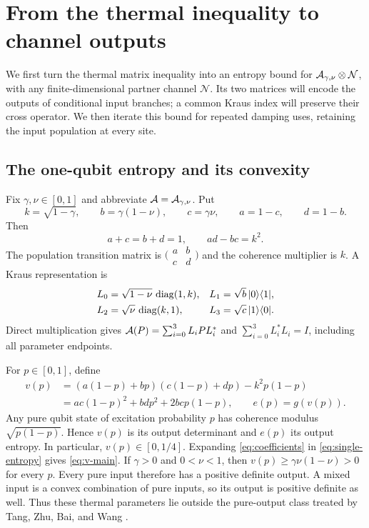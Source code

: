 \section{From the thermal inequality to channel outputs}\label{sec:output}

We first turn the thermal matrix inequality into an entropy bound for
$\mathcal A_{\gamma,\nu}\otimes\mathcal N$, with any finite-dimensional
partner channel $\mathcal N$. Its two matrices will encode the outputs
of conditional input branches; a common Kraus index will preserve their
cross operator. We then iterate this bound for repeated damping uses,
retaining the input population at every site.

\subsection{The one-qubit entropy and its convexity}

Fix $\gamma,\nu\in[0,1]$ and abbreviate
$\mathcal A=\mathcal A_{\gamma,\nu}$. Put
\begin{equation}\label{eq:coefficients}
 k=\sqrt{1-\gamma},\qquad b=\gamma(1-\nu),\qquad
 c=\gamma\nu,\qquad a=1-c,\qquad d=1-b.
\end{equation}
Then
\begin{equation}\label{eq:coefficient-identities}
 a+c=b+d=1,\qquad ad-bc=k^2.
\end{equation}
The population transition matrix is
$\bigl(\begin{smallmatrix}a&b\\c&d\end{smallmatrix}\bigr)$ and
the coherence multiplier is $k$. A Kraus representation is
\begin{equation}\label{eq:kraus}
 \begin{aligned}
 L_0&=\sqrt{1-\nu}\,\operatorname{diag}(1,k),&
 L_1&=\sqrt b\,\lvert 0\rangle\langle 1\rvert,\\
 L_2&=\sqrt\nu\,\operatorname{diag}(k,1),&
 L_3&=\sqrt c\,\lvert 1\rangle\langle 0\rvert.
 \end{aligned}
\end{equation}
Direct multiplication gives $\mathcal A(P)=\sum_{i=0}^3L_iPL_i^*$ and
$\sum_{i=0}^3L_i^*L_i=I$, including all parameter endpoints.

For $p\in[0,1]$, define
\begin{equation}\label{eq:single-entropy}
 \begin{split}
 v(p)&=(a(1-p)+bp)(c(1-p)+dp)-k^2p(1-p)\\
     &=ac(1-p)^2+bdp^2+2bcp(1-p),\qquad e(p)=g(v(p)).
 \end{split}
\end{equation}
Any pure qubit state of excitation probability $p$ has coherence
modulus $\sqrt{p(1-p)}$. Hence $v(p)$ is its output determinant and
$e(p)$ its output entropy. In particular, $v(p)\in[0,1/4]$.
Expanding \eqref{eq:coefficients} in \eqref{eq:single-entropy} gives
\eqref{eq:v-main}. If $\gamma>0$ and $0<\nu<1$,
then $v(p)\ge\gamma\nu(1-\nu)>0$ for every $p$. Every pure input
therefore has a positive definite output. A mixed input is a convex
combination of pure inputs, so its output is positive definite as well.
Thus these thermal parameters lie outside the pure-output class treated
by Tang, Zhu, Bai, and Wang
\cite[Corollary~5.1 and Lemma~5.2]{TangEtAl2026}.

